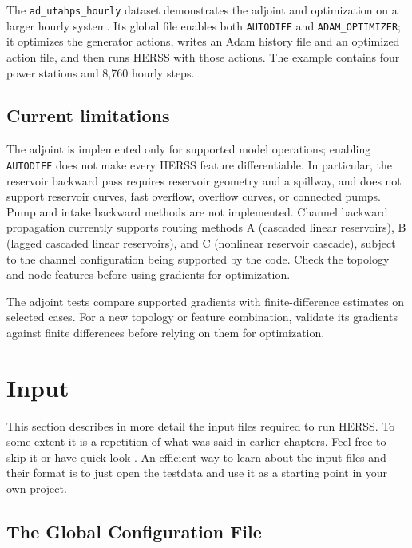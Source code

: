 \documentclass[a4paper, 12pt]{report}
\begin{document}
The \texttt{ad\_utahps\_hourly} dataset demonstrates the adjoint and
optimization on a larger hourly system. Its global file enables both
\texttt{AUTODIFF} and \texttt{ADAM\_OPTIMIZER}; it optimizes the generator
actions, writes an Adam history file and an optimized action file, and then
runs HERSS with those actions. The example contains four power stations and
8,760 hourly steps.

\subsection{Current limitations}

The adjoint is implemented only for supported model operations; enabling
\texttt{AUTODIFF} does not make every HERSS feature differentiable. In
particular, the reservoir backward pass requires reservoir geometry and a
spillway, and does not support reservoir curves, fast overflow, overflow
curves, or connected pumps. Pump and intake backward methods are not
implemented. Channel backward propagation currently supports routing
methods A (cascaded linear reservoirs), B (lagged cascaded linear reservoirs),
and C (nonlinear reservoir cascade), subject to the channel configuration
being supported by the code. Check the topology and node features before
using gradients for optimization.

The adjoint tests compare supported gradients with finite-difference
estimates on selected cases. For a new topology or feature combination,
validate its gradients against finite differences before relying on them
for optimization.




    \pagebreak 
    
    
    
    
	\section{Input}
	This section describes in more detail the input files required to run HERSS. To some extent it is a repetition of what was said in earlier chapters. Feel free to skip it or have quick look \smiley{}. An efficient way to learn about the input files and their format is to just open the testdata and use it as a starting point in your own project. 
	
	\subsection{The Global Configuration File}
	\label{sec:globalconfig}
\end{document}
